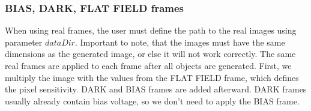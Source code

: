 \subsubsection{BIAS, DARK, FLAT FIELD frames}
When using real frames, the user must define the path to the real images using parameter $dataDir$. Important to note, that the images must have the same dimensions as the generated image, or else it will not work correctly. The same real frames are applied to each frame after all objects are generated. First, we multiply the image with the values from the FLAT FIELD frame, which defines the pixel sensitivity. DARK and BIAS frames are added afterward. DARK frames usually already contain bias voltage, so we don't need to apply the BIAS frame.



